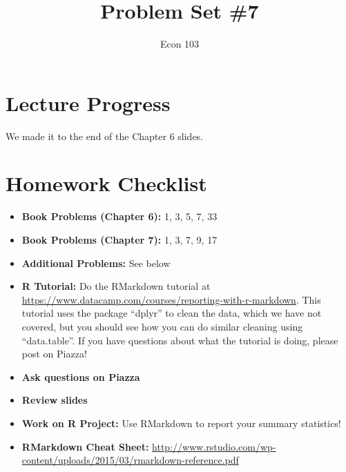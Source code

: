 \documentclass[addpoints,12pt]{exam}
\title{Problem Set \#7}
\author{Econ 103}
\date{}
\begin{document}
\maketitle

\section*{Lecture Progress}
We made it to the end of the Chapter 6 slides.

\section*{Homework Checklist}

\begin{itemize}[label = $\square$]
	\item \textbf{Book Problems (Chapter 6):} 1, 3, 5, 7, 33
	\item \textbf{Book Problems (Chapter 7):} 1, 3, 7, 9, 17
	\item \textbf{Additional Problems: }See below
	\item\textbf{R Tutorial:} Do the RMarkdown tutorial at \url{https://www.datacamp.com/courses/reporting-with-r-markdown}. This tutorial uses the package ``dplyr'' to clean the data, which we have not covered, but you should see how you can do similar cleaning using ``data.table''. If you have questions about what the tutorial is doing, please post on Piazza!
	\item \textbf{Ask questions on Piazza}
	\item\textbf{Review slides}
	\item \textbf{Work on R Project:} Use RMarkdown to report your summary statistics!
	\item \textbf{RMarkdown Cheat Sheet:} \url{http://www.rstudio.com/wp-content/uploads/2015/03/rmarkdown-reference.pdf}
\end{itemize}
\end{document}
